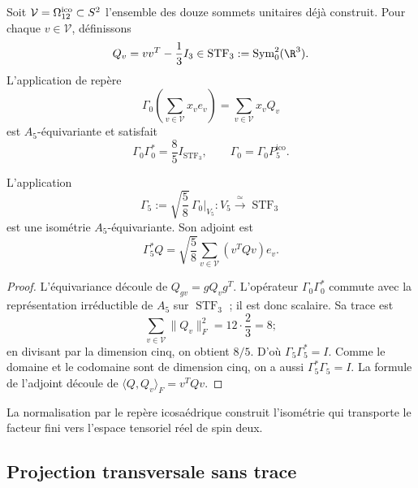 Soit \(\mathcal V=\Omega_{12}^{\rm ico}\subset S^2\) l’ensemble des
douze sommets unitaires déjà construit. Pour chaque \(v\in\mathcal V\), définissons
\begin{equation}
\label{ii:ii:pent:eq:gravity-Qv}
Q_v=vv^T-\frac13I_3\in
\operatorname{STF}_3:=\operatorname{Sym}^2_0(\R^3).
\end{equation}
L’application de repère
\begin{equation}
\label{ii:ii:pent:eq:gravity-Gamma0}
\Gamma_0\!\left(\sum_{v\in\mathcal V}x_ve_v\right)
=\sum_{v\in\mathcal V}x_vQ_v
\end{equation}
est \(A_5\)-équivariante et satisfait
\begin{equation}
\label{ii:ii:pent:eq:gravity-tight-frame}
\Gamma_0\Gamma_0^*=\frac85I_{\operatorname{STF}_3},
\qquad
\Gamma_0=\Gamma_0P^{\mathrm{ico}}_5.
\end{equation}

\begin{theorem}
\label{ii:ii:pent:thm:gravity-gamma5}
L’application
\begin{equation}
\label{ii:ii:pent:eq:gravity-gamma5}
\boxed{
\Gamma_5:=\sqrt{\frac58}\,\Gamma_0|_{V_5}:
V_5\xrightarrow{\ \simeq\ }\operatorname{STF}_3}
\end{equation}
est une isométrie \(A_5\)-équivariante. Son adjoint est
\begin{equation}
\label{ii:ii:pent:eq:gravity-gamma5-adjoint}
\Gamma_5^*Q=\sqrt{\frac58}
\sum_{v\in\mathcal V}(v^TQv)e_v.
\end{equation}
\end{theorem}

\begin{proof}
L’équivariance découle de \(Q_{gv}=gQ_vg^T\). L’opérateur
\(\Gamma_0\Gamma_0^*\) commute avec la représentation irréductible de
\(A_5\) sur \(\operatorname{STF}_3\) ; il est donc scalaire. Sa trace
est
\[
\sum_{v\in\mathcal V}\|Q_v\|_F^2
=12\cdot\frac23=8;
\]
en divisant par la dimension cinq, on obtient \(8/5\). D’où
\(\Gamma_5\Gamma_5^*=I\). Comme le domaine et le codomaine sont de dimension
cinq, on a aussi \(\Gamma_5^*\Gamma_5=I\). La formule de l’adjoint
découle de \(\langle Q,Q_v\rangle_F=v^TQv\).
\end{proof}

La normalisation par le repère icosaédrique construit l’isométrie qui
transporte le facteur fini vers l’espace tensoriel réel de spin deux.

\subsection{Projection transversale sans trace}

